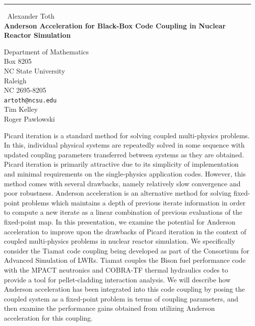 \documentclass{report}
\begin{document}
\begin{center}
\rule{6in}{1pt} \
{\large Alexander Toth \\
{\bf Anderson Acceleration for Black-Box Code Coupling in Nuclear Reactor Simulation}}

Department of Mathematics \\ Box 8205 \\ NC State University \\ Raleigh \\ NC 2695-8205
\\
{\tt artoth@ncsu.edu}\\
Tim Kelley\\
Roger Pawlowski\end{center}

Picard iteration is a standard method for solving coupled multi-physics
problems. In this, individual physical systems are repeatedly solved in
some sequence with updated coupling parameters transferred between
systems as they are obtained. Picard iteration is primarily attractive
due to its simplicity of implementation and minimal requirements on the
single-physics application codes. However, this method comes with several
drawbacks, namely relatively slow convergence and poor robustness.
Anderson acceleration is an alternative method for solving fixed-point
problems which maintains a depth of previous iterate information in order
to compute a new iterate as a linear combination of previous evaluations
of the fixed-point map. In this presentation, we examine the potential
for Anderson acceleration to improve upon the drawbacks of Picard
iteration in the context of coupled multi-physics problems in nuclear
reactor simulation. We specifically consider the Tiamat code coupling
being developed as part of the Consortium for Advanced Simulation of
LWRs. Tiamat couples the Bison fuel performance code with the MPACT
neutronics and COBRA-TF thermal hydraulics codes to provide a tool for
pellet-cladding interaction analysis. We will describe how Anderson
acceleration has been integrated into this code coupling by posing the
coupled system as a fixed-point problem in terms of coupling parameters,
and then examine the performance gains obtained from utilizing Anderson
acceleration for this coupling.
\end{document}
